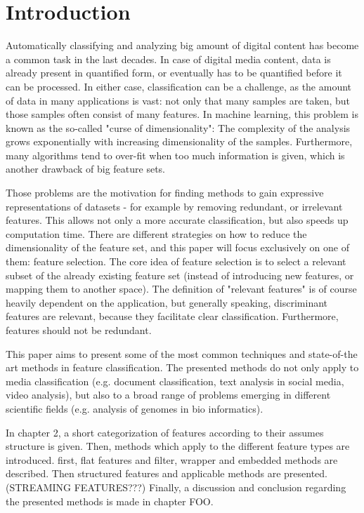 \section{Introduction}
\label{sec:introduction}


Automatically classifying and analyzing big amount of digital content has become a common task in the last decades. In case of digital media content, data is already present in quantified form, or eventually has to be quantified before it can be processed. In either case, classification can be a challenge, as the amount of data in many applications is vast: not only that many samples are taken, but those samples often consist of many features. In machine learning, this problem is known as the so-called "curse of dimensionality": The complexity of the analysis grows exponentially with increasing dimensionality of the samples. Furthermore, many algorithms tend to over-fit when too much information is given, which is another drawback of big feature sets. \cite{Verikas:02}

Those problems are the motivation for finding methods to gain expressive representations of datasets - for example by removing redundant, or irrelevant features. This allows not only a more accurate classification, but also speeds up computation time. There are different strategies on how to reduce the dimensionality of the feature set, and this paper will focus exclusively on one of them: feature selection. The core idea of feature selection is to select a relevant subset of the already existing feature set (instead of introducing new features, or mapping them to another space). The definition of "relevant features" is of course heavily dependent on the application, but generally speaking, discriminant features are relevant, because they facilitate clear classification. Furthermore, features should not be redundant.

This paper aims to present some of the most common techniques and state-of-the art methods in feature classification. The presented methods do not only apply to media classification (e.g. document classification, text analysis in social media, video analysis), but also to a broad range of problems emerging in different scientific fields (e.g. analysis of genomes in bio informatics).

In chapter 2, a short categorization of features according to their assumes structure is given. Then, methods which apply to the different feature types are introduced. first, flat features and filter, wrapper and embedded methods are described. Then structured features and applicable methods are presented. (STREAMING FEATURES???) Finally, a discussion and conclusion regarding the presented methods is made in chapter FOO.


